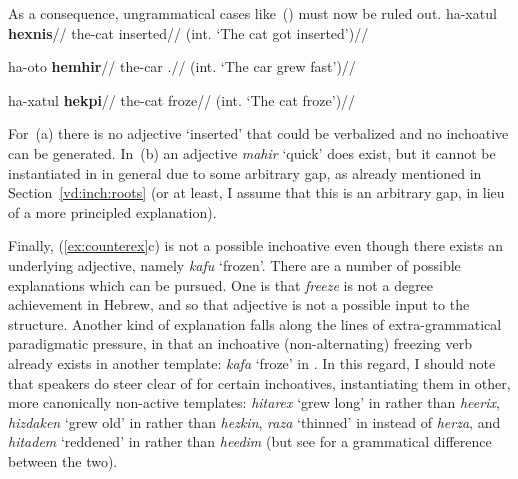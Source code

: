 	\ex\label{tree:vd:thif-inch}
	\xe
\bigskip

As a consequence, ungrammatical cases like~(\nextx) must now be ruled out.
\pex\label{ex:counterex}
	\a \ljudge{*}
		\begingl
		\gla ha-xatul \textbf{hexnis}//
		\glb the-cat inserted//
		\glft (int. `The cat got inserted')//
	\endgl
	
	\a \ljudge{*}
		\begingl
		\gla ha-oto \textbf{hemhir}//
		\glb the-car .//
		\glft (int. `The car grew fast')//
	\endgl

	\a \ljudge{*}
		\begingl
		\gla ha-xatul \textbf{hekpi}//
		\glb the-cat froze//
		\glft (int. `The cat froze')//
	\endgl
\xe

For~(\lastx a) there is no adjective `inserted' that could be verbalized and no inchoative can be generated. In~(\lastx b) an adjective \emph{mahir} `quick' does exist, but it cannot be instantiated in {\thif} in general due to some arbitrary gap, as already mentioned in Section~\ref{vd:inch:roots} (or at least, I assume that this is an arbitrary gap, in lieu of a more principled explanation).

Finally, (\ref{ex:counterex}c) is not a possible inchoative even though there exists an underlying adjective, namely \emph{kafu} `frozen'. There are a number of possible explanations which can be pursued. One is that \emph{freeze} is not a degree achievement in Hebrew, and so that adjective is not a possible input to the structure. Another kind of explanation falls along the lines of extra-grammatical paradigmatic pressure, in that an inchoative (non-alternating) freezing verb already exists in another template: \emph{kafa} `froze' in {\tkal}. In this regard, I should note that speakers do steer clear of {\thif} for certain inchoatives, instantiating them in other, more canonically non-active templates: \emph{hitarex} `grew long' in {\thit} rather than \emph{heerix}, \emph{hizdaken} `grew old' in {\thit} rather than \emph{hezkin}, \emph{raza} `thinned' in {\tkal} instead of \emph{herza}, and \emph{hitadem} `reddened' in {\thit} rather than \emph{heedim} (but see \citealt[22]{doron03} for a grammatical difference between the two).

